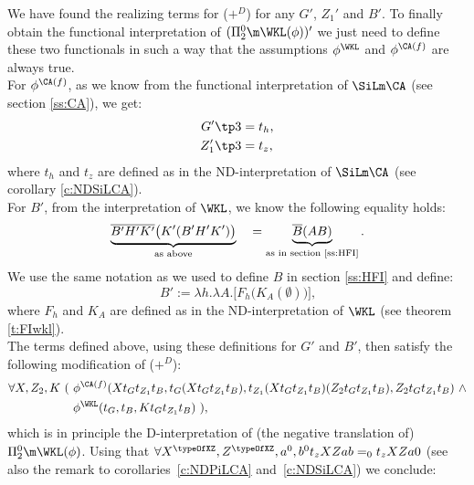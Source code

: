 We have found the realizing terms for ($+^D$) for any $G'$, $Z_1'$ and $B'$. To finally obtain
the functional interpretation of $(\Pi^0_2\m\WKL(\phi))'$ we just need to 
define these two functionals in such a way that the 
assumptions $\phi^{\WKL}$ and $\phi^{\CA(f)}$ are always true.\\
For $\phi^{\CA(f)}$, as we know from the functional interpretation of $\SiLm\CA$ 
(see section \ref{ss:CA}), we get:
\begin{align*}
      {G'}\tp3&=t_h \text{,}\\
      {Z_1'}\tp3&=t_z
\text{,} 
\end{align*}
where $t_h$ and $t_z$ are defined as in the ND-interpretation of $\SiLm\CA$ 
(see corollary \ref{c:NDSiLCA}).\\
For $B'$, from the interpretation of $\WKL$, we know the following
equality holds:
\[ 
\underbrace{\overline {B'H'K'}\big(K'(B'H'K')\big)}_{\text{as above}}\quad = 
\underbrace{\overline{B}(AB)}_{\text{as in section \ref{ss:HFI}}} 
\text{.} 
\]
We use the same notation as we used to define $B$ in section \ref{ss:HFI} and define:
\[
        B':=\lambda h.\lambda A.\big[F_h\big(K_{A}(\emptyset)\big)\big] \text{,}
\]
where $F_h$ and $K_A$ are defined as in the ND-interpretation of $\WKL$
(see theorem \ref{t:FIwkl}).\\
The terms defined above, using these definitions for $G'$ and $B'$, then satisfy the following
modification of ($+^D$):
\begin{align*}
\forall X,Z_2,K\ (\ &\phi^{\CA(f)}(
 Xt_{G}t_{Z_1}t_{B},
 t_{G}(Xt_{G}t_{Z_1}t_{B}),
 t_{Z_1}( Xt_{G}t_{Z_1}t_{B} )( Z_2t_Gt_{Z_1}t_{B} ),
 Z_2t_Gt_{Z_1}t_{B})\ \wedge\\
 &\phi^{\WKL}(t_{G},t_{B},Kt_{G}t_{Z_1}t_{B})\ ) \text{,}
\end{align*}
which is in principle the D-interpretation of (the negative translation of)\linebreak[2] $\Pi^0_2\m\WKL(\phi)$.
Using that $\forall X^{\typeOfXZ},Z^{\typeOfXZ},a^0,b^0 t_zXZab=_0t_zXZa0$ (see also the remark
to corollaries~\ref{c:NDPiLCA} and~\ref{c:NDSiLCA}) we conclude:
%
%
